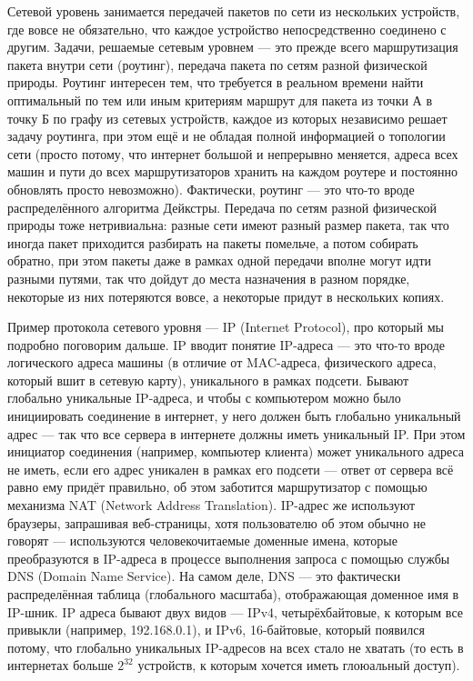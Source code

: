 \documentclass[a5paper]{article}
\begin{document}
Сетевой уровень занимается передачей пакетов по сети из нескольких устройств, где вовсе не обязательно, что каждое устройство непосредственно соединено с другим. Задачи, решаемые сетевым уровнем --- это прежде всего маршрутизация пакета внутри сети (роутинг), передача пакета по сетям разной физической природы. Роутинг интересен тем, что требуется в реальном времени найти оптимальный по тем или иным критериям маршрут для пакета из точки А в точку Б по графу из сетевых устройств, каждое из которых независимо решает задачу роутинга, при этом ещё и не обладая полной информацией о топологии сети (просто потому, что интернет большой и непрерывно меняется, адреса всех машин и пути до всех маршрутизаторов хранить на каждом роутере и постоянно обновлять просто невозможно). Фактически, роутинг --- это что-то вроде распределённого алгоритма Дейкстры. Передача по сетям разной физической природы тоже нетривиальна: разные сети имеют разный размер пакета, так что иногда пакет приходится разбирать на пакеты помельче, а потом собирать обратно, при этом пакеты даже в рамках одной передачи вполне могут идти разными путями, так что дойдут до места назначения в разном порядке, некоторые из них потеряются вовсе, а некоторые придут в нескольких копиях.

Пример протокола сетевого уровня --- IP (Internet Protocol), про который мы подробно поговорим дальше. IP вводит понятие IP-адреса --- это что-то вроде логического адреса машины (в отличие от MAC-адреса, физического адреса, который вшит в сетевую карту), уникального в рамках подсети. Бывают глобально уникальные IP-адреса, и чтобы с компьютером можно было инициировать соединение в интернет, у него должен быть глобально уникальный адрес --- так что все сервера в интернете должны иметь уникальный IP. При этом инициатор соединения (например, компьютер клиента) может уникального адреса не иметь, если его адрес уникален в рамках его подсети --- ответ от сервера всё равно ему придёт правильно, об этом заботится маршрутизатор с помощью механизма NAT (Network Address Translation). IP-адрес же используют браузеры, запрашивая веб-страницы, хотя пользователю об этом обычно не говорят --- используются человекочитаемые доменные имена, которые преобразуются в IP-адреса в процессе выполнения запроса с помощью службы DNS (Domain Name Service). На самом деле, DNS --- это фактически распределённая таблица (глобального масштаба), отображающая доменное имя в IP-шник. IP адреса бывают двух видов --- IPv4, четырёхбайтовые, к которым все привыкли (например, 192.168.0.1), и IPv6, 16-байтовые, который появился потому, что глобально уникальных IP-адресов на всех стало не хватать (то есть в интернетах больше $2^32$ устройств, к которым хочется иметь глоюальный доступ).
\end{document}
